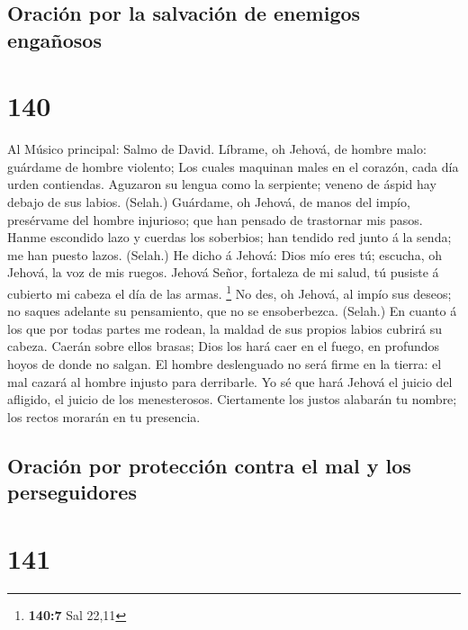 \hypertarget{oraciuxf3n-por-la-salvaciuxf3n-de-enemigos-engauxf1osos}{%
\subsection{Oración por la salvación de enemigos
engañosos}\label{oraciuxf3n-por-la-salvaciuxf3n-de-enemigos-engauxf1osos}}

\hypertarget{section-139}{%
\section{140}\label{section-139}}

 Al Músico principal: Salmo de David. Líbrame, oh Jehová, de
hombre malo: guárdame de hombre violento;  Los cuales
maquinan males en el corazón, cada día urden contiendas. 
Aguzaron su lengua como la serpiente; veneno de áspid hay debajo de sus
labios. (Selah.)  Guárdame, oh Jehová, de manos del impío,
presérvame del hombre injurioso; que han pensado de trastornar mis
pasos.  Hanme escondido lazo y cuerdas los soberbios; han
tendido red junto á la senda; me han puesto lazos. (Selah.) 
He dicho á Jehová: Dios mío eres tú; escucha, oh Jehová, la voz de mis
ruegos.  Jehová Señor, fortaleza de mi salud, tú pusiste á
cubierto mi cabeza el día de las armas. \footnote{\textbf{140:7} Sal
  22,11}  No des, oh Jehová, al impío sus deseos; no saques
adelante su pensamiento, que no se ensoberbezca. (Selah.) 
En cuanto á los que por todas partes me rodean, la maldad de sus propios
labios cubrirá su cabeza.  Caerán sobre ellos brasas; Dios
los hará caer en el fuego, en profundos hoyos de donde no salgan.
 El hombre deslenguado no será firme en la tierra: el mal
cazará al hombre injusto para derribarle.  Yo sé que hará
Jehová el juicio del afligido, el juicio de los menesterosos.
 Ciertamente los justos alabarán tu nombre; los rectos
morarán en tu presencia.

\hypertarget{oraciuxf3n-por-protecciuxf3n-contra-el-mal-y-los-perseguidores}{%
\subsection{Oración por protección contra el mal y los
perseguidores}\label{oraciuxf3n-por-protecciuxf3n-contra-el-mal-y-los-perseguidores}}

\hypertarget{section-140}{%
\section{141}\label{section-140}}

